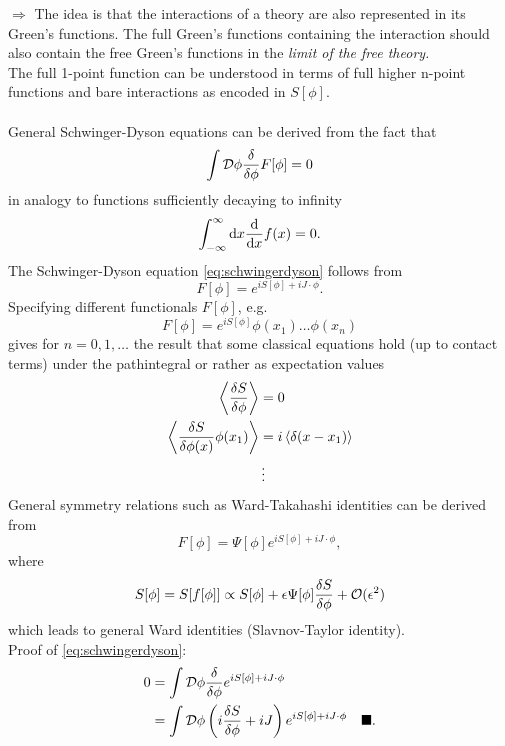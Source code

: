 $\Rightarrow$ The idea is that the interactions of a theory are also represented in its Green's functions. The full Green's functions containing the interaction should also contain the free Green's functions in the \emph{limit of the free theory.}\\
The full 1-point function can be understood in terms of full higher n-point functions and bare interactions as encoded in $S[\phi]$.\\
\\
General Schwinger-Dyson equations can be derived from the fact that
\begin{equation}
	\int \mathcal{D} \phi \frac{\delta}{\delta \phi} F[\phi] =0
\end{equation}
in analogy to functions sufficiently decaying to infinity
\begin{equation}
	\int_{-\infty}^{\infty} \mathrm{d} x \frac{\mathrm{d}}{\mathrm{d} x}f(x) =0.
\end{equation}
The Schwinger-Dyson equation \ref{eq:schwingerdyson} follows from
\begin{equation}
F[\phi] = e^{i S[\phi] +iJ\cdot \phi}.
\end{equation}
Specifying different functionals $F[\phi]$, e.g.
\begin{equation}
	F[\phi] = e^{i S[\phi]} \phi(x_1) \dots \phi(x_n)
\end{equation}
gives for $n=0,1,\dots$ the result that some classical equations hold (up to contact terms) under the pathintegral or rather as expectation values
\begin{align}
	\expval{\frac{\delta S}{\delta \phi}} &= 0\\
	\expval{\frac{\delta S}{\delta \phi(x)} \phi(x_1)} &= i \expval{\delta(x-x_1)} \\
	&\vdots
\end{align}
General symmetry relations such as Ward-Takahashi identities can be derived from
\begin{equation}
	F[\phi] = \Psi[\phi] e^{i S[\phi] + i J\cdot \phi},
\end{equation}
where 
\begin{equation}
	S[\phi] = S[f[\phi]] \propto S[\phi] + \epsilon \Psi[\phi] \frac{\delta S}{\delta \phi} + \mathcal{O}(\epsilon^2)
\end{equation}
which leads to general Ward identities (Slavnov-Taylor identity).\\
Proof of \ref{eq:schwingerdyson}:
\begin{align*}
	0&= \int \mathcal{D} \phi \frac{\delta}{\delta \phi} e^{i S[\phi] + i J\cdot \phi} \\
	&= \int \mathcal{D} \phi \left(i\frac{\delta S}{\delta \phi} + i J\right) e^{i S[\phi]+ i J\cdot \phi} \quad \blacksquare.
\end{align*}
